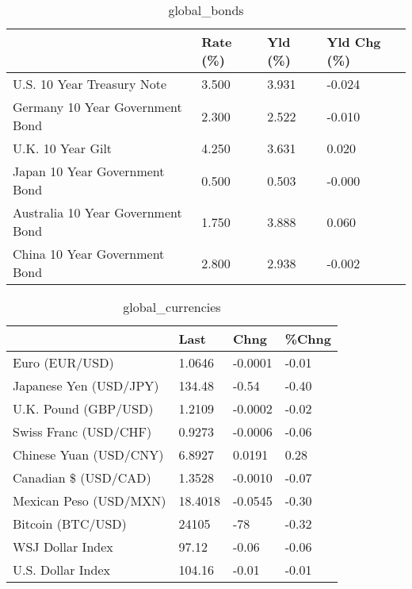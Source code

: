 \documentclass{article}%
\begin{document}
%


\begin{table}[htbp]%
\caption{global\_bonds}%
\centering%
\begin{adjustbox}{width=1\textwidth}%
\begin{tabular}{llll}
\toprule
                                  & Rate (\%) & Yld (\%) & Yld Chg (\%) \\
\midrule
       U.S. 10 Year Treasury Note &    3.500 &   3.931 &      -0.024 \\
  Germany 10 Year Government Bond &    2.300 &   2.522 &      -0.010 \\
                U.K. 10 Year Gilt &    4.250 &   3.631 &       0.020 \\
    Japan 10 Year Government Bond &    0.500 &   0.503 &      -0.000 \\
Australia 10 Year Government Bond &    1.750 &   3.888 &       0.060 \\
    China 10 Year Government Bond &    2.800 &   2.938 &      -0.002 \\
\bottomrule
\end{tabular}
%
\end{adjustbox}%
\end{table}

%


\begin{table}[htbp]%
\caption{global\_currencies}%
\centering%
\begin{adjustbox}{width=1\textwidth}%
\begin{tabular}{llll}
\toprule
                       &    Last &    Chng & \%Chng \\
\midrule
        Euro (EUR/USD) &  1.0646 & -0.0001 & -0.01 \\
Japanese Yen (USD/JPY) &  134.48 &   -0.54 & -0.40 \\
  U.K. Pound (GBP/USD) &  1.2109 & -0.0002 & -0.02 \\
 Swiss Franc (USD/CHF) &  0.9273 & -0.0006 & -0.06 \\
Chinese Yuan (USD/CNY) &  6.8927 &  0.0191 &  0.28 \\
  Canadian \$ (USD/CAD) &  1.3528 & -0.0010 & -0.07 \\
Mexican Peso (USD/MXN) & 18.4018 & -0.0545 & -0.30 \\
     Bitcoin (BTC/USD) &   24105 &     -78 & -0.32 \\
      WSJ Dollar Index &   97.12 &   -0.06 & -0.06 \\
     U.S. Dollar Index &  104.16 &   -0.01 & -0.01 \\
\bottomrule
\end{tabular}
%
\end{adjustbox}%
\end{table}
\end{document}
